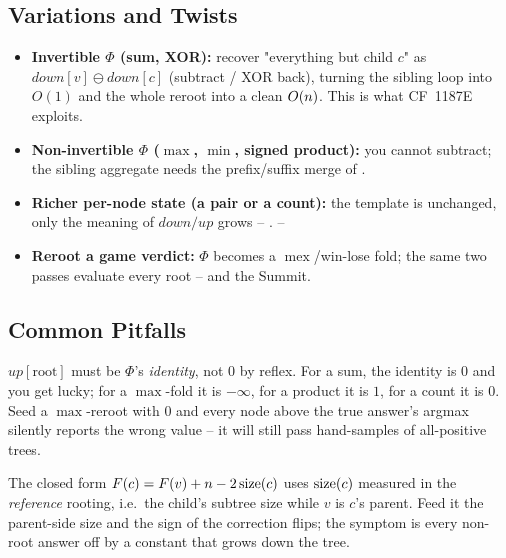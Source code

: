 \subsection{Variations and Twists}

\begin{itemize}[nosep]
  \item \textbf{Invertible $\Phi$ (sum, XOR):} recover "everything but child
        $c$" as $\mathit{down}[v] \ominus \mathit{down}[c]$ (subtract / XOR
        back), turning the sibling loop into $O(1)$ and the whole reroot into a
        clean $O(n)$. This is what CF~1187E exploits. \hfill{}
  \item \textbf{Non-invertible $\Phi$ ($\max$, $\min$, signed product):} you
        cannot subtract; the sibling aggregate needs the prefix/suffix merge of
        . \hfill{}
  \item \textbf{Richer per-node state (a pair or a count):} the template is
        unchanged, only the meaning of $\mathit{down}/\mathit{up}$ grows --
        . \hfill{}--
  \item \textbf{Reroot a game verdict:} $\Phi$ becomes a
        $\operatorname{mex}$/win-lose fold; the same two passes evaluate every
        root --  and the Summit. \hfill{}
\end{itemize}

\subsection{Common Pitfalls}

\begin{warningbox}
$\mathit{up}[\text{root}]$ must be $\Phi$'s \emph{identity}, not $0$ by reflex.
For a sum, the identity is $0$ and you get lucky; for a $\max$-fold it is
$-\infty$, for a product it is $1$, for a count it is $0$. Seed a $\max$-reroot
with $0$ and every node above the true answer's argmax silently reports the
wrong value -- it will still pass hand-samples of all-positive trees.
\end{warningbox}

\begin{warningbox}
The closed form $F(c)=F(v)+n-2\operatorname{size}(c)$ uses $\operatorname{size}(c)$ measured in the
\emph{reference} rooting, i.e.\ the child's subtree size while $v$ is $c$'s
parent. Feed it the parent-side size and the sign of the correction flips; the
symptom is every non-root answer off by a constant that grows down the tree.
\end{warningbox}

